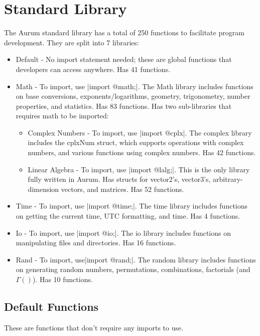 \documentclass[12pt, letterpaper, oneside]{article}
\begin{document}
	\section{Standard Library}
	The Aurum standard library has a total of 250 functions to facilitate program development. They are split into 7 libraries:
	\begin{itemize}
		\item[--] Default - No import statement needed; these are global functions that developers can access anywhere. Has 41 functions.
		\item[--] Math - To import, use \spverb|import @math;|. The Math library includes functions on base conversions, exponents/logarithms, geometry, trigonometry, number properties, and statistics. Has 83 functions. Has two sub-libraries that requires math to be imported:
		\begin{itemize}
			\item[--] Complex Numbers - To import, use \spverb|import @cplx|. The complex library includes the cplxNum struct, which supports operations with complex numbers, and various functions using complex numbers. Has 42 functions.
			\item[--] Linear Algebra - To import, use \spverb|import @lalg;|. This is the only library fully written in Aurum. Has structs for vector2's, vector3's, arbitrary-dimension vectors, and matrices. Has 52 functions.
		\end{itemize}
		\item[--] Time - To import, use \spverb|import @time;|. The time library includes functions on getting the current time, UTC formatting, and time. Has 4 functions.
		\item[--] Io - To import, use \spverb|import @io;|. The io library includes functions on manipulating files and directories. Has 16 functions.
		\item[--] Rand - To import, use\spverb|import @rand;|. The random library includes functions on generating random numbers, permutations, combinations, factorials (and $\Gamma()$). Has 10 functions.
		\newpage
	\end{itemize}
	\subsection{Default Functions}
	These are functions that don't require any imports to use.
\end{document}
